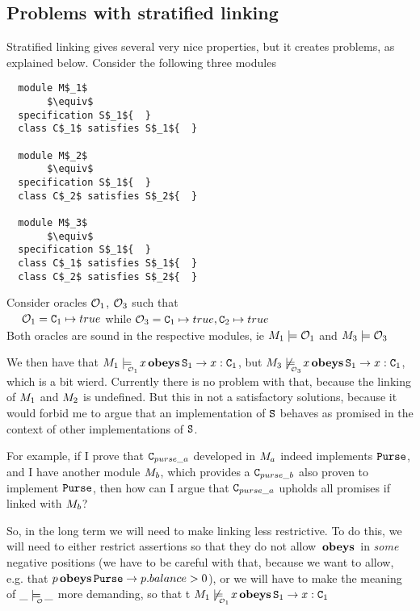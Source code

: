 \subsection{Problems with stratified linking}
\label{problems:stratified:problems}
Stratified linking gives several very nice properties, but it creates problems, as explained below.
Consider the following three modules

 \begin{lstlisting}
  module M$_1$
       $\equiv$
  specification S$_1${  }
  class C$_1$ satisfies S$_1${  }
  
  module M$_2$
       $\equiv$
  specification S$_1${  }
  class C$_2$ satisfies S$_2${  }
  
  module M$_3$
       $\equiv$
  specification S$_1${  }
  class C$_1$ satisfies S$_1${  }
  class C$_2$ satisfies S$_2${  }
  \end{lstlisting}
  
\noindent
Consider oracles ${\cal O}_1$,  ${\cal O}_3$ such that\\
$\strut ~ \ \ \ {\cal O}_1={\textrm{\ttfamily{C}}}_1 \mapsto true$ while ${\cal O}_3={\textrm{\ttfamily{C}}}_1 \mapsto true, {\textrm{\ttfamily{C}}}_2 \mapsto true$
\\
Both oracles are sound in the respective modules, ie $M_1 \models {\ensuremath{\cal O}}_1$ and $M_3 \models {\ensuremath{\cal O}}_3$


We then have that $\M_1 \modelsWith{\O_1} x \obeys \SPC_1 \rightarrow x:\CP_1$, but
$\M_3 \not\modelsWith{\O_3} x \obeys \SPC_1 \rightarrow x:\CP_1$, which is a bit wierd.
Currently there is no problem with that, because the linking of $M_1$ and $M_2$ is undefined. 
But this in not a satisfactory
solutions, because it would forbid me to argue that an implementation of ${\textrm{\ttfamily{S}}}$ behaves as promised in the context of other
implementations of ${\textrm{\ttfamily{S}}}$. 

For example,   if I prove that ${\textrm{\ttfamily{C}}}_{purse\_a}$ developed in $M_a$ indeed implements ${\textrm{\ttfamily{Purse}}}$, and
I have another module $M_b$, which provides a  ${\textrm{\ttfamily{C}}}_{purse\_b}$ also proven to implement   ${\textrm{\ttfamily{Purse}}}$, then
how can I argue that  ${\textrm{\ttfamily{C}}}_{purse\_a}$ upholds all promises if linked with  $M_b$? 

So, in the long term we will need to make linking less restrictive. To do this, we will need to either restrict assertions 
so that they do not allow $\,\textbf{\textrm{obeys}}\,$ in {\em some} negative positions (we have to be careful with that, because we want to allow, e.g.
that $p \,\textbf{\textrm{obeys}}\, {\textrm{\ttfamily{Purse}}} \rightarrow p.balance>0$), or we will have to make the meaning of $\_ \modelsWith{\O} \_$ more
demanding, so that t $\M_1 \not\modelsWith{\O_1} x \obeys \SPC_1 \rightarrow x:\CP_1$

